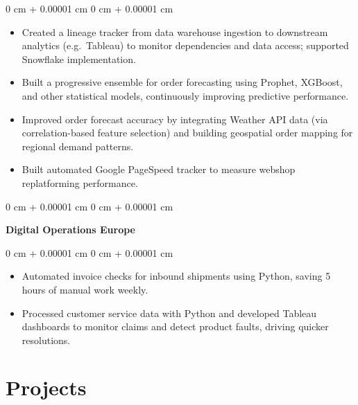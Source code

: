 \documentclass[10pt, letterpaper]{article}
\newenvironment{onecolentry}{
    \begin{adjustwidth}{
        0 cm + 0.00001 cm
    }{
        0 cm + 0.00001 cm
    }
}{
    \end{adjustwidth}
} %
\begin{document}
        \vspace{0.05 cm}
        \begin{onecolentry}
            \setlength{\leftmargini}{2em}
            \begin{itemize}
                \item Created a lineage tracker from data warehouse ingestion to downstream analytics (e.g.\ Tableau) to monitor dependencies and data access; supported Snowflake implementation.
                \item Built a progressive ensemble for order forecasting using Prophet, XGBoost, and other statistical models, continuously improving predictive performance.
                \item Improved order forecast accuracy by integrating Weather API data (via correlation-based feature selection) and building geospatial order mapping for regional demand patterns.
                \item Built automated Google PageSpeed tracker to measure webshop replatforming performance.
            \end{itemize}
        \end{onecolentry}

        \vspace{0.2 cm}
        \begin{onecolentry}
            \hspace{0.3cm}\textbf{Digital Operations Europe}
        \end{onecolentry}

        \vspace{0.05 cm}
        \begin{onecolentry}
            \setlength{\leftmargini}{2em}
            \begin{itemize}
                \item Automated invoice checks for inbound shipments using Python, saving 5 hours of manual work weekly.
                \item Processed customer service data with Python and developed Tableau dashboards to monitor claims and detect product faults, driving quicker resolutions.
            \end{itemize}
        \end{onecolentry}

    
    \section{Projects}
\end{document}
